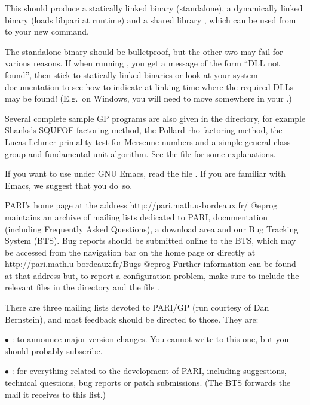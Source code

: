 This should produce a statically linked binary 
(standalone), a dynamically linked binary  (loads libpari
at runtime) and a shared library , which can be used from
 to  your new  command.

The standalone binary should be bulletproof, but the other two may fail
for various reasons. If when running , you get a message
of the form ``DLL not found'', then stick to statically linked binaries
or look at your system documentation to see how to indicate at linking
time where the required DLLs may be found! (E.g.~on Windows, you will
need to move  somewhere in your .)

 Several complete sample GP programs are also given in
the  directory, for example Shanks's SQUFOF factoring method,
the Pollard rho factoring method, the Lucas-Lehmer primality test for
Mersenne numbers and a simple general class group and fundamental unit
algorithm. See the file  for some explanations.

 If you want to use  under GNU Emacs, read the file
. If you are familiar with Emacs, we suggest that
you do~so.

 PARI's home page at the address
\bprog
  http://pari.math.u-bordeaux.fr/
@eprog\noindent
maintains an archive of mailing lists dedicated to PARI, documentation
(including Frequently Asked Questions), a download area and our Bug Tracking
System (BTS). Bug reports should be submitted online to the BTS, which may be
accessed from the navigation bar on the home page or directly at
\bprog
  http://pari.math.u-bordeaux.fr/Bugs
@eprog\noindent
Further information can be found at that address but, to report a
configuration problem, make sure to include the relevant  files in
the  directory and the file .
\smallskip

There are three mailing lists devoted to PARI/GP (run courtesy of Dan
Bernstein), and most feedback should be directed to those. They are:

$\bullet$ : to announce major version changes.
You cannot write to this one, but you should probably subscribe.

$\bullet$ : for everything related to the development
of PARI, including suggestions, technical questions, bug reports or patch
submissions. (The BTS forwards the mail it receives to this list.)

